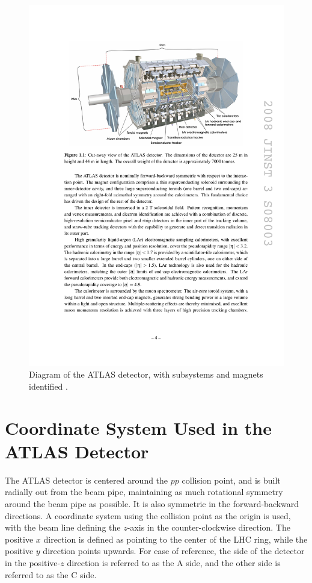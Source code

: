 \begin{centering}
\begin{figure}[!htb]
\myfloatalign
\includegraphics[width=.90\linewidth]{figures/atlas/detector.pdf}
\caption{Diagram of the \ac{ATLAS} detector, with subsystems and magnets identified \cite{PERF-2007-01}.}
\label{fig:detector}
\end{figure}
\end{centering}

\section{Coordinate System Used in the ATLAS Detector}
\label{sec:coords}

The \ac{ATLAS} detector is centered around the $pp$ collision point, and is built radially out from the beam pipe, maintaining as much rotational symmetry around the beam pipe as possible. It is also symmetric in the forward-backward directions. A coordinate system using the collision point as the origin is used, with the beam line defining the $z$-axis in the counter-clockwise direction. The positive $x$ direction is defined as pointing to the center of the \ac{LHC} ring, while the positive $y$ direction points upwards. For ease of reference, the side of the detector in the positive-$z$ direction is referred to as the A side, and the other side is referred to as the C side. 

